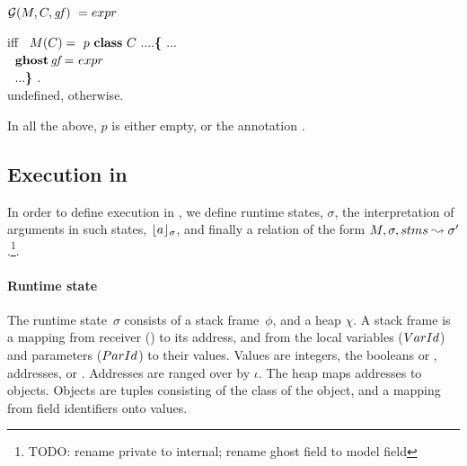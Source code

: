 \begin{definition}[Lookup]
\noindent
 $
   {\cal G} ({M}, {{C}}, {\mathit{gf}})\      =       expr $

\noindent
 iff \ $ \M(\syntax{C}) =\ p\  \kw{class}\  \syntax{C} \ .... \lb ...  $\\
$ ~ $  \hspace{.87in} $ {\bf {ghost}}\,   {\mathit{gf}}\, {\bf {=}}\  expr $\\
$ ~ $ \hspace{.7in} $ ... {\mbox{\tt{\bf{\} }}}}.$
\\
\noindent
undefined, otherwise.

 $ ~ $ \\
\noindent
{In all the above, $p$ is either empty, or the annotation . }
\end{definition}


  \subsection{Execution  in \LangOO}



In order to define execution in  \LangOO, we define runtime states, $\sigma$, the interpretation of arguments in such states,
${\lfloor{ {a}}\rfloor_{\sigma}} $, and finally a relation of the form $M, \sigma, stms \leadsto \sigma'$.\footnote{TODO: rename private to internal; rename ghost field to model field}.



  \paragraph{Runtime state}
\label{formal:state} The runtime state~$\sigma$ consists of a stack frame~$\phi$, and a heap $\chi$. A stack frame  is  a mapping from
  receiver (\this) to its address, and from {the local variables (${VarId}$) and parameters (${ParId}$) to their values.}  Values are integers,
 the booleans  or , addresses, or . Addresses are ranged over by $\iota$. The heap maps addresses to objects. Objects are tuples consisting of the class of the object, and a  mapping from field identifiers onto values.


